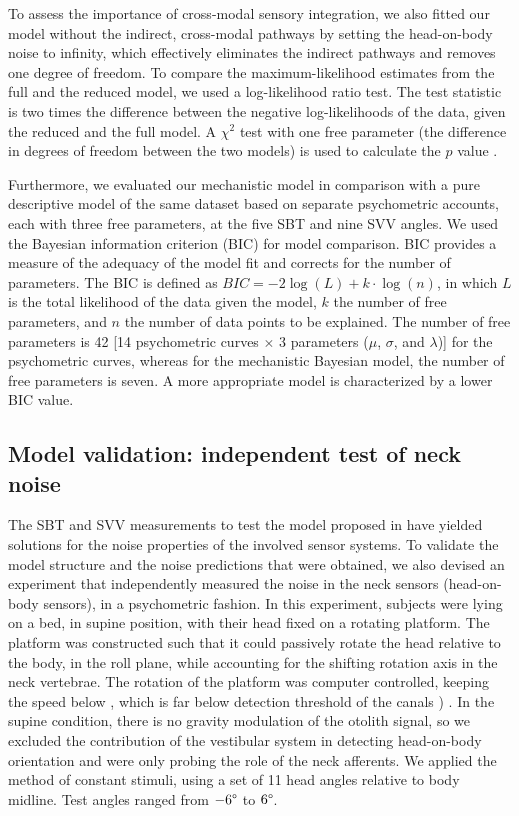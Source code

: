 To assess the importance of cross-modal sensory integration, we also fitted our model without the indirect, cross-modal pathways by setting the head-on-body noise to infinity, which effectively eliminates the indirect pathways and removes one degree of freedom. To compare the maximum-likelihood estimates from the full and the reduced model, we used a log-likelihood ratio test. The test statistic is two times the difference between the negative log-likelihoods of the data, given the reduced and the full model. A $\chi^2$ test with one free parameter (the difference in degrees of freedom between the two models) is used to calculate the $p$ value \cite{dobson2001}.

Furthermore, we evaluated our mechanistic model in comparison with a pure descriptive model of the same dataset based on separate psychometric accounts, each with three free parameters, at the five SBT and nine SVV angles. We used the Bayesian information criterion (BIC) for model comparison. BIC provides a measure of the adequacy of the model fit and corrects for the number of parameters. The BIC is defined as $BIC = -2 \log(L) + k \cdot \log(n)$, in which $L$ is the total likelihood of the data given the model, $k$ the number of free parameters, and $n$ the number of data points to be explained. The number of free parameters is 42 [14 psychometric curves $\times$ 3 parameters ($\mu$, $\sigma$, and $\lambda$)] for the psychometric curves, whereas for the mechanistic Bayesian model, the number of free parameters is seven. A more appropriate model is characterized by a lower BIC value. 


\subsection{Model validation: independent test of neck noise}

The SBT and SVV measurements to test the model proposed in  have yielded solutions for the noise properties of the involved sensor systems. To validate the model structure and the noise predictions that were obtained, we also devised an experiment that independently measured the noise in the neck sensors (head-on-body sensors), in a psychometric fashion. In this experiment, subjects were lying on a bed, in supine position, with their head fixed on a rotating platform. The platform was constructed such that it could passively rotate the head relative to the body, in the roll plane, while accounting for the shifting rotation axis in the neck vertebrae. The rotation of the platform was computer controlled, keeping the speed below , which is far below detection threshold of the canals ) \cite{benson1989}. In the supine condition, there is no gravity modulation of the otolith signal, so we excluded the contribution of the vestibular system in detecting head-on-body orientation and were only probing the role of the neck afferents. We applied the method of constant stimuli, using a set of 11 head angles relative to body midline. Test angles ranged from $-6\degree$ to $6\degree$. 

